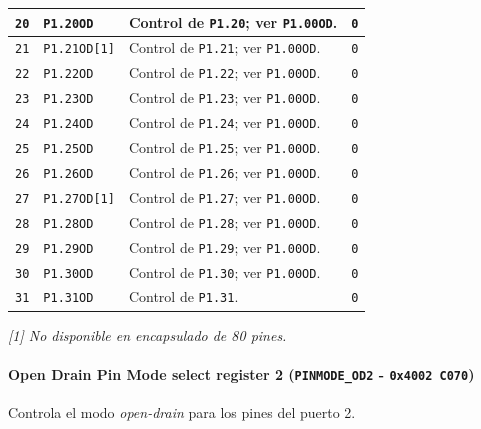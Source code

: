\begin{longtable}{|>{\raggedright\arraybackslash}p{}|>{\raggedright\arraybackslash}p{}|>{\raggedright\arraybackslash}p{}|>{\centering\arraybackslash}p{}|}
\hline
\texttt{20} & \texttt{P1.20OD} & Control de \texttt{P1.20}; ver \texttt{P1.00OD}. & \texttt{0} \\
\hline
\texttt{21} & \texttt{P1.21OD[1]} & Control de \texttt{P1.21}; ver \texttt{P1.00OD}. & \texttt{0} \\
\hline
\texttt{22} & \texttt{P1.22OD} & Control de \texttt{P1.22}; ver \texttt{P1.00OD}. & \texttt{0} \\
\hline
\texttt{23} & \texttt{P1.23OD} & Control de \texttt{P1.23}; ver \texttt{P1.00OD}. & \texttt{0} \\
\hline
\texttt{24} & \texttt{P1.24OD} & Control de \texttt{P1.24}; ver \texttt{P1.00OD}. & \texttt{0} \\
\hline
\texttt{25} & \texttt{P1.25OD} & Control de \texttt{P1.25}; ver \texttt{P1.00OD}. & \texttt{0} \\
\hline
\texttt{26} & \texttt{P1.26OD} & Control de \texttt{P1.26}; ver \texttt{P1.00OD}. & \texttt{0} \\
\hline
\texttt{27} & \texttt{P1.27OD[1]} & Control de \texttt{P1.27}; ver \texttt{P1.00OD}. & \texttt{0} \\
\hline
\texttt{28} & \texttt{P1.28OD} & Control de \texttt{P1.28}; ver \texttt{P1.00OD}. & \texttt{0} \\
\hline
\texttt{29} & \texttt{P1.29OD} & Control de \texttt{P1.29}; ver \texttt{P1.00OD}. & \texttt{0} \\
\hline
\texttt{30} & \texttt{P1.30OD} & Control de \texttt{P1.30}; ver \texttt{P1.00OD}. & \texttt{0} \\
\hline
\texttt{31} & \texttt{P1.31OD} & Control de \texttt{P1.31}. & \texttt{0} \\
\hline
\end{longtable}
\noindent\textit{[1] No disponible en encapsulado de 80 pines.}

\paragraph{Open Drain Pin Mode select register 2 (\texttt{PINMODE\_OD2} - \texttt{0x4002 C070})}
Controla el modo \textit{open-drain} para los pines del puerto 2.

